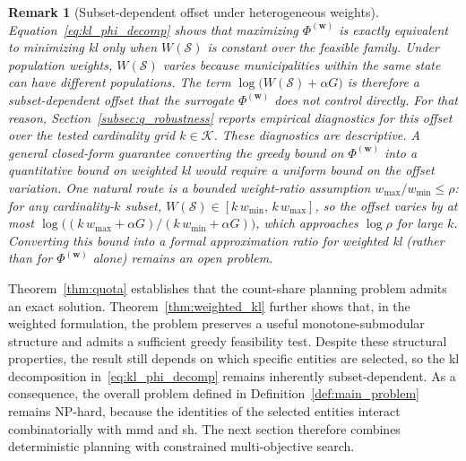 \documentclass[10pt,journal]{IEEEtran}
\newcommand{\kGrid}{\mathcal{K}}
\newcommand{\1}{\mathbf{1}}
\newcommand{\bw}{\mathbf{w}}
\newcommand{\Sel}{\mathcal{S}}
\theoremstyle{ieeethm}
\newtheorem{remark}{Remark}
\begin{document}
\begin{remark}[Subset-dependent offset under heterogeneous weights]
\label{rem:surrogate_gap}
Equation~\eqref{eq:kl_phi_decomp} shows that maximizing $\Phi^{(\bw)}$ is exactly equivalent to minimizing \gls{kl} only when $W(\Sel)$ is constant over the feasible family. Under population weights, $W(\Sel)$ varies because municipalities within the same state can have different populations. The term $\log\!\big(W(\Sel)+\alpha G\big)$ is therefore a subset-dependent offset that the surrogate $\Phi^{(\bw)}$ does not control directly. For that reason, Section~\ref{subsec:q_robustness} reports empirical diagnostics for this offset over the tested cardinality grid $k\in\kGrid$. These diagnostics are descriptive. 
A general closed-form guarantee converting the greedy bound on $\Phi^{(\bw)}$ into a quantitative bound on weighted \gls{kl} would require a uniform bound on the offset variation. One natural route is a bounded weight-ratio assumption $w_{\max}/w_{\min}\le\rho$: for any cardinality-$k$ subset, $W(\Sel)\in[k\,w_{\min},\,k\,w_{\max}]$, so the offset varies by at most $\log\!\big((k\,w_{\max}+\alpha G) / (k\,w_{\min}+\alpha G)\big)$, which approaches $\log\rho$ for large $k$. Converting this bound into a formal approximation ratio for weighted \gls{kl} (rather than for $\Phi^{(\bw)}$ alone) remains an open problem.
\end{remark}

Theorem~\ref{thm:quota} establishes that the count-share planning problem admits an exact solution. Theorem~\ref{thm:weighted_kl} further shows that, in the weighted formulation, the problem preserves a useful monotone-submodular structure and admits a sufficient greedy feasibility test. Despite these structural properties, the result still depends on which specific entities are selected, so the \gls{kl} decomposition in~\eqref{eq:kl_phi_decomp} remains inherently subset-dependent. As a consequence, the overall problem defined in Definition~\ref{def:main_problem} remains NP-hard, because the identities of the selected entities interact combinatorially with \gls{mmd} and \gls{sh}. The next section therefore combines deterministic planning with constrained multi-objective search.

\end{document}
